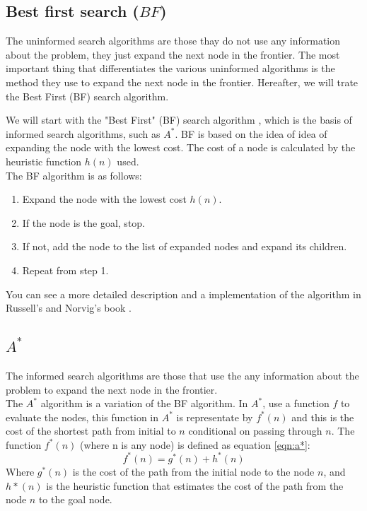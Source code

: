 \documentclass[runningheads]{llncs}
\begin{document}
\subsection{Best first search (\(BF\))}
The uninformed search algorithms are those thay do not use any information about the problem, they just expand the next node in the frontier.
The most important thing that differentiates the various uninformed algorithms is the method they use to expand the next node in the frontier.
Hereafter, we will trate the Best First (BF) search algorithm.

We will start with the "Best First" (BF) search algorithm \cite{algorithms}, which is the basis of informed search algorithms, such as \(A^*\).
BF is based on the idea of idea of expanding the node with the lowest cost. The cost of a node is calculated by the heuristic function \(h(n)\) used. \\
The BF algorithm is as follows:
\begin{enumerate}
\item Expand the node with the lowest cost \(h(n)\).
\item If the node is the goal, stop.
\item If not, add the node to the list of expanded nodes and expand its children.
\item Repeat from step 1.
\end{enumerate}

You can see a more detailed description and a implementation of the algorithm in Russell's and Norvig's book \cite{algorithms_2}.

\subsection{\(A^*\)}

The informed search algorithms are those that use the any information about the problem to expand the next node in the frontier.\\
The \(A^*\) algorithm is a variation of the BF algorithm. In \(A^*\), use a function \(f\) to evaluate the nodes, this function in \(A^*\) is representate by \(f^*(n)\) and this is the cost of the shortest path from initial to \(n\) conditional on passing through \(n\).
The function \(f^*(n)\) (where n is any node) is defined as equation \ref{eqn:a*}:
\begin{equation}\label{eqn:a*}
f^*(n) = g^*(n) + h^*(n)
\end{equation}
Where \(g^*(n)\) is the cost of the path from the initial node to the node \(n\), and \(h*(n)\) is the heuristic function that estimates the cost of the path from the node \(n\) to the goal node.
\end{document}
